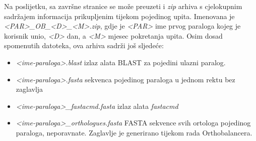 \begin{sloppypar}

Na poslijetku, sa završne stranice se može preuzeti i \emph{zip} arhiva s
cjelokupnim sadržajem informacija prikupljenim tijekom pojedinog upita.
Imenovana je \emph{<PAR>\_OB\_<D>\_<M>.zip}, gdje je \emph{<PAR>}
ime prvog paraloga kojeg je korisnik unio, \emph{<D>} dan, a \emph{<M>}
mjesec pokretanja upita. Osim dosad spomenutih datoteka, ova arhiva sadrži još
sljedeće:

\end{sloppypar}

\begin{itemize}

    \item \emph{<ime-paraloga>.blast} izlaz alata BLAST za pojedini ulazni
paralog.

    \item \emph{<ime-paraloga>.fasta} sekvenca pojedinog paraloga u jednom
rektu bez zaglavlja

    \item \emph{<ime-paraloga>\_fastacmd.fasta} izlaz alata \emph{fastacmd}

    \item \emph{<ime-paraloga>\_orthologues.fasta} FASTA sekvence svih ortologa
pojedinog paraloga, neporavnate. Zaglavlje je generirano tijekom rada
Orthobalancera.

\end{itemize}
